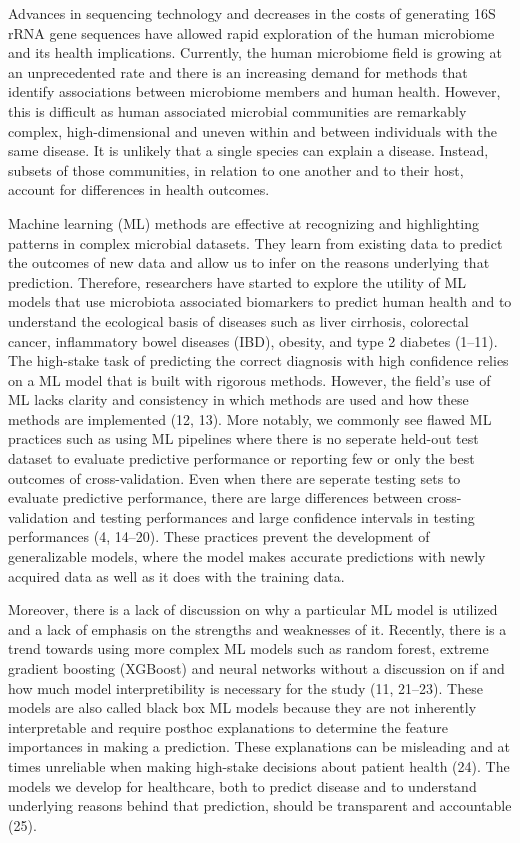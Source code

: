 \documentclass[11pt,]{article}
\begin{document}
Advances in sequencing technology and decreases in the costs of
generating 16S rRNA gene sequences have allowed rapid exploration of the
human microbiome and its health implications. Currently, the human
microbiome field is growing at an unprecedented rate and there is an
increasing demand for methods that identify associations between
microbiome members and human health. However, this is difficult as human
associated microbial communities are remarkably complex,
high-dimensional and uneven within and between individuals with the same
disease. It is unlikely that a single species can explain a disease.
Instead, subsets of those communities, in relation to one another and to
their host, account for differences in health outcomes.

Machine learning (ML) methods are effective at recognizing and
highlighting patterns in complex microbial datasets. They learn from
existing data to predict the outcomes of new data and allow us to infer
on the reasons underlying that prediction. Therefore, researchers have
started to explore the utility of ML models that use microbiota
associated biomarkers to predict human health and to understand the
ecological basis of diseases such as liver cirrhosis, colorectal cancer,
inflammatory bowel diseases (IBD), obesity, and type 2 diabetes (1--11).
The high-stake task of predicting the correct diagnosis with high
confidence relies on a ML model that is built with rigorous methods.
However, the field's use of ML lacks clarity and consistency in which
methods are used and how these methods are implemented (12, 13). More
notably, we commonly see flawed ML practices such as using ML pipelines
where there is no seperate held-out test dataset to evaluate predictive
performance or reporting few or only the best outcomes of
cross-validation. Even when there are seperate testing sets to evaluate
predictive performance, there are large differences between
cross-validation and testing performances and large confidence intervals
in testing performances (4, 14--20). These practices prevent the
development of generalizable models, where the model makes accurate
predictions with newly acquired data as well as it does with the
training data.

Moreover, there is a lack of discussion on why a particular ML model is
utilized and a lack of emphasis on the strengths and weaknesses of it.
Recently, there is a trend towards using more complex ML models such as
random forest, extreme gradient boosting (XGBoost) and neural networks
without a discussion on if and how much model interpretibility is
necessary for the study (11, 21--23). These models are also called black
box ML models because they are not inherently interpretable and require
posthoc explanations to determine the feature importances in making a
prediction. These explanations can be misleading and at times unreliable
when making high-stake decisions about patient health (24). The models
we develop for healthcare, both to predict disease and to understand
underlying reasons behind that prediction, should be transparent and
accountable (25).
\end{document}

